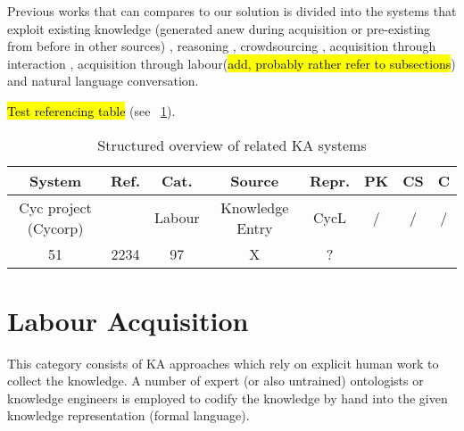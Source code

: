Previous works that can compares to our solution is divided into the systems that exploit existing knowledge (generated anew during acquisition or pre-existing from before in other sources) \parencite{Singh2002a,Witbrock2003,Forbus2007,Kvo2010,Sharma2010,Mitchel2015}, reasoning \parencite{Witbrock2003,Speer2007,Speer2008,Kuo2010}, crowdsourcing \parencite{Singh2002,Speer2009, Kuo2010, Pedro2012a, Pedro2013}, acquisition through interaction \parencite{Speer2009,Pedro2012,Pedro2013}, acquisition through labour(\hl{add, probably rather refer to subsections}) \parencite{} and natural language conversation\parencite{Pedro2012, Speer2007,Speer2009, Witbrock2003,Kuo2010}.

\hl{Test referencing table} (see \tablename~\ref{tab:related}).

\begin{table}[htb]
	\caption{Structured overview of related KA systems}
	\label{tab:related}
	\centering
	\begin{tabular}{cccccccc}
		\hline
		System & Ref. & Cat. & Source & Repr. & PK &  CS & C \\
		\hline
		Cyc project (Cycorp) & \parencite{Lenat1995} & Labour & Knowledge Entry & CycL & / & / & / \\
		51 & 2234 & 97 & X & ? \\
		\hline
	\end{tabular}
\end{table}

\section{Labour Acquisition}
This category consists of KA approaches which rely on explicit human work to collect the knowledge. A number of expert (or also untrained) ontologists or knowledge engineers is employed to codify the knowledge by hand into the given knowledge representation (formal language). 

